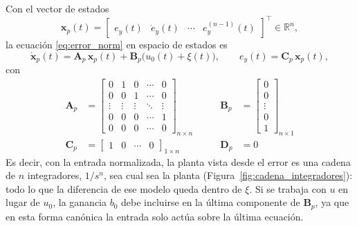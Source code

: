 Con el vector de estados
\begin{equation}
\mathbf{x}_p(t) =
\begin{bmatrix} e_y(t) & \dot{e}_y(t) & \cdots & e_y^{(n-1)}(t) \end{bmatrix}^{\top}
\in \mathbb{R}^{n},
\end{equation}
la ecuación \eqref{eq:error_norm} en espacio de estados es
\begin{equation}
\dot{\mathbf{x}}_p(t) = \mathbf{A}_p\,\mathbf{x}_p(t) + \mathbf{B}_p\bigl(u_0(t) + \xi(t)\bigr),
\qquad
e_y(t) = \mathbf{C}_p\,\mathbf{x}_p(t),
\end{equation}
con
\begin{equation}
  \begin{aligned}
  \mathbf{A}_p &=
  \begin{bmatrix}
  0 & 1 & 0 & \cdots & 0 \\
  0 & 0 & 1 & \cdots & 0 \\
  \vdots & \vdots & \vdots & \ddots & \vdots \\
  0 & 0 & 0 & \cdots & 1 \\
  0 & 0 & 0 & \cdots & 0
  \end{bmatrix}_{n \times n}
  & \qquad
  \mathbf{B}_p &=
  \begin{bmatrix}
  0 \\ 0 \\ \vdots \\ 0 \\ 1
  \end{bmatrix}_{n \times 1} \\[1.5em]
  \mathbf{C}_p &=
  \begin{bmatrix}
  1 & 0 & \cdots & 0
  \end{bmatrix}_{1 \times n}
  & \qquad
  \mathbf{D}_p &= 0
  \end{aligned}
\end{equation}
Es decir, con la entrada normalizada, la planta vista desde el error es una
cadena de $n$ integradores, $1/s^{n}$, sea cual sea la planta
(Figura~\ref{fig:cadena_integradores}): todo lo que
la diferencia de ese modelo queda dentro de $\xi$. Si se trabaja con $u$ en lugar de
$u_0$, la ganancia $b_0$ debe incluirse en la última componente de
$\mathbf{B}_p$, ya que en esta forma canónica la entrada solo actúa sobre la
última ecuación.

